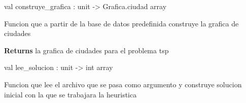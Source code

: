 \documentclass[11pt]{article}
\begin{document}
\label{val:Umbrales.construye-underscoregrafica}\begin{ocamldoccode}
val construye_grafica : unit -> Grafica.ciudad array
\end{ocamldoccode}
\begin{ocamldocdescription}
Funcion que a partir de la base de datos predefinida construye la grafica de ciudades

{\bf Returns }la grafica de ciudades para el problema tsp


\end{ocamldocdescription}




\label{val:Umbrales.lee-underscoresolucion}\begin{ocamldoccode}
val lee_solucion : unit -> int array
\end{ocamldoccode}
\begin{ocamldocdescription}
Funcion que lee el archivo que se pasa como argumento y construye solucion inicial
	con la que se trabajara la heuristica


\end{ocamldocdescription}
\end{document}
